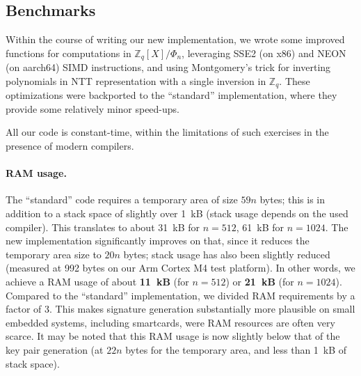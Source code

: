 \documentclass{llncs}
\newcommand{\bZ}{\mathbb{Z}}
\begin{document}
\subsection{Benchmarks}

Within the course of writing our new implementation, we wrote some
improved functions for computations in $\bZ_q[X]/\Phi_n$, leveraging
SSE2 (on x86) and NEON (on aarch64) SIMD instructions, and using
Montgomery's trick for inverting polynomials in NTT representation with
a single inversion in $\bZ_q$. These optimizations were backported to
the ``standard'' implementation, where they provide some relatively
minor speed-ups.

All our code is constant-time, within the limitations of such exercises
in the presence of modern compilers\cite{Por2025-2}.

\paragraph{RAM usage.}
The ``standard'' code requires a temporary area of size $59n$ bytes;
this is in addition to a stack space of slightly over 1~kB (stack usage
depends on the used compiler). This translates to about 31~kB for $n =
512$, 61~kB for $n = 1024$. The new implementation significantly
improves on that, since it reduces the temporary area size to $20n$
bytes; stack usage has also been slightly reduced (measured at 992 bytes
on our Arm Cortex M4 test platform). In other words, we achieve a RAM
usage of about \textbf{11~kB} (for $n = 512$) or \textbf{21~kB} (for $n
= 1024$). Compared to the ``standard'' implementation, we divided RAM
requirements by a factor of 3. This makes signature generation
substantially more plausible on small embedded systems, including
smartcards, were RAM resources are often very scarce. It may be noted
that this RAM usage is now slightly below that of the key pair
generation (at $22n$ bytes for the temporary area, and less than 1~kB of
stack space).
\end{document}
